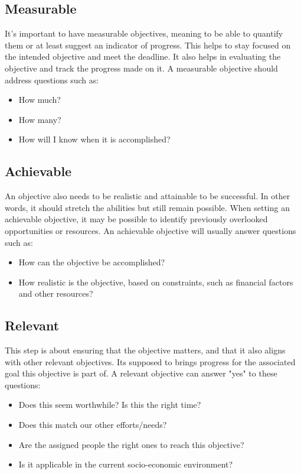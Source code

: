 \documentclass[11pt,a4paper]{article}
\begin{document}
\subsection*{Measurable}
It's important to have measurable objectives, meaning to be able to quantify
them or at least suggest an indicator of progress. This helps to stay focused
on the intended objective and meet the deadline. It also helps in evaluating
the objective and track the progress made on it. A measurable objective should
address questions such as:
\begin{itemize}
\item How much?
\item How many?
\item How will I know when it is accomplished?
\end{itemize}

\subsection*{Achievable}
An objective also needs to be realistic and attainable to be successful. In
other words, it should stretch the abilities but still remain possible. When
setting an achievable objective, it may be possible to identify previously
overlooked opportunities or resources. An achievable objective will usually
answer questions such as:
\begin{itemize}
\item How can the objective be accomplished? 
\item How realistic is the objective, based on constraints, such as financial
  factors and other resources?
\end{itemize}


\subsection*{Relevant}
This step is about ensuring that the objective matters, and that it also
aligns with other relevant objectives. Its supposed to brings progress for the
associated goal this objective is part of. A relevant objective can answer
"yes" to these questions:
\begin{itemize}
\item Does this seem worthwhile?  Is this the right time?
\item Does this match our other efforts/needs?
\item Are the assigned people the right ones to reach this objective?
\item Is it applicable in the current socio-economic environment?
\end{itemize}
\end{document}
